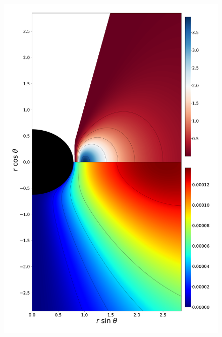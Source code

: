 \documentclass[twocolumn,aps,showpacs,showkeys,prd,superscriptaddress,byrevtex, amsmath]{revtex4-1}
\begin{document}
\begin{figure}
\centering
\includegraphics[scale=0.12]{figures/fig6_I_10.pdf}
\hspace{-0.4cm}

\end{figure}
\end{document}
